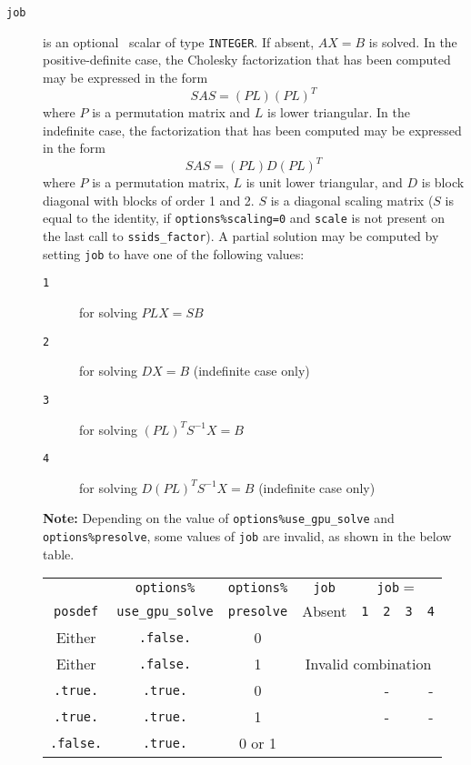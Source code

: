 \documentclass{spral}
\newcommand{\cmark}{\ding{51}}
\newcommand{\xmark}{\ding{55}}
\begin{document}
\begin{description}
\item[\texttt{job}] is an optional  \intentin\ scalar of
type  {\tt INTEGER}. If absent, ${AX = B}$ is solved.
In the positive-definite case, the Cholesky factorization
that has been computed may be expressed in the form
\[ {SAS} = ({PL})({PL})^T \]
where $P$ is a permutation matrix and $L$ is lower triangular.
In the indefinite case, the factorization
that has been computed may be expressed in the form
\[ {S AS} = ({PL}){D}({PL})^T \]
where $P$ is a permutation matrix, $L$ is unit lower triangular,
and $D$ is block diagonal with blocks of order 1 and 2.
$S$ is a diagonal scaling matrix ($S$ is equal to the identity,
if \texttt{options\%scaling=0} and
{\tt scale} is not present on the last call to {\tt ssids\_factor}).
A partial solution may be computed by setting {\tt job} to have
one of the following values:
\begin{description}
\item[\texttt{1}] for solving ${PLX} = {SB}$
\item[\texttt{2}] for solving ${DX} = {B}$ (indefinite case only)
\item[\texttt{3}] for solving $({PL})^T{S^{-1}X} = {B}$
\item[\texttt{4}] for solving $D({PL})^T{S^{-1}X} = {B}$ (indefinite case only)
\end{description}
{\bf Note:} Depending on the value of \texttt{options\%use\_gpu\_solve} and
\texttt{options\%presolve}, some values of \texttt{job} are invalid, as shown
in the below table.

\begin{tabular}{ccc|ccccc}
   \hline
   & \texttt{options\%} & \texttt{options\%} & \texttt{job} & \multicolumn{4}{c}{\texttt{job}$=$} \\
   \texttt{posdef} & \texttt{use\_gpu\_solve} & \texttt{presolve} & Absent & {\tt 1} & {\tt 2} & {\tt 3} & {\tt 4} \\
   \hline
   Either & \texttt{.false.} & 0 & \cmark & \cmark & \cmark & \cmark & \cmark \\
   Either & \texttt{.false.} & 1 & \multicolumn{5}{c}{Invalid combination} \\
   \texttt{.true.} & \texttt{.true.} & 0 & \xmark & \xmark & - & \xmark & - \\
   \texttt{.true.} & \texttt{.true.} & 1 & \cmark & \cmark & - & \cmark & - \\
   \texttt{.false.} & \texttt{.true.} & 0 or 1 & \cmark & \cmark & \xmark & \xmark & \cmark \\
   \hline
\end{tabular}

\end{description}
\end{document}
